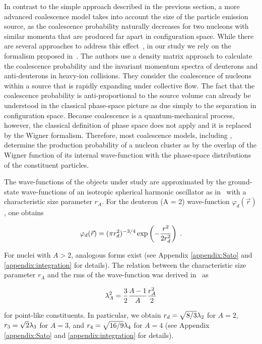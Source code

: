 \documentclass[a4paper,11pt]{scrartcl}
\begin{document}
In contrast to the simple approach described in the previous section, a more advanced coalescence model takes into account the size of the particle emission source, as the coalescence probability naturally decreases for two nucleons with similar momenta that are produced far apart in configuration space. While there are several approaches to address this effect~\cite{Sato:1981ez, Nagle:1996vp}, in our study we rely on the formalism proposed in~\cite{Scheibl:1998tk}. The authors use a density matrix approach to calculate the coalescence probability and the invariant momentum spectra of deuterons and anti-deuterons in heavy-ion collisions. They consider the coalescence of nucleons within a source that is rapidly expanding under collective flow.
The fact that the coalescence probability is anti-proportional to the source volume can already be understood in the classical phase-space picture as due simply to the separation in configuration space. Because coalescence is a quantum-mechanical process, however, the classical definition of phase space does not apply and it is replaced by the Wigner formalism. Therefore, most coalescence models, including \cite{Scheibl:1998tk}, determine the production probability of a nucleon cluster as by the overlap of the Wigner function of its internal wave-function with the phase-space distributions of the constituent particles.

The wave-functions of the objects under study are approximated by the ground-state wave-functions of an isotropic spherical harmonic oscillator as in~\cite{Scheibl:1998tk} with a characteristic size parameter $r_{A}$. For the deuteron (A = 2) wave-function $\varphi_{d}(\vec{r}) $, one obtains

\begin{equation}\label{eq:WaveHeinz}
 \varphi_{d}(\vec{r}) = (\pi r_{d}^2)^{-3/4} \exp\left(-{r^2 \over 2 r_{d}^2}\right) \;.
\end{equation}

\noindent For nuclei with $A > 2$, analogous forms exist (see Appendix \ref{appendix:Sato} and \ref{appendix:integration} for details). The relation between the characteristic size parameter $r_{A}$ and the rms of the wave-function was derived in~\cite{Shebeko:2006ud} as

\begin{equation}
 \lambda_{A}^2 = {3 \over 2}{A - 1 \over A} {r_{A}^2 \over 2}
\end{equation} 

\noindent for point-like constituents. In particular, we obtain $r_{d}= \sqrt{8/3}  \lambda_{2}$ for $A = 2$, $r_{3}= \sqrt{2}{\lambda_{3}}$ for $A = 3$, and  $r_{4}= \sqrt{16/9} \lambda_{4}$ for $A=4$ (see Appendix \ref{appendix:Sato} and \ref{appendix:integration} for details).
\end{document}
